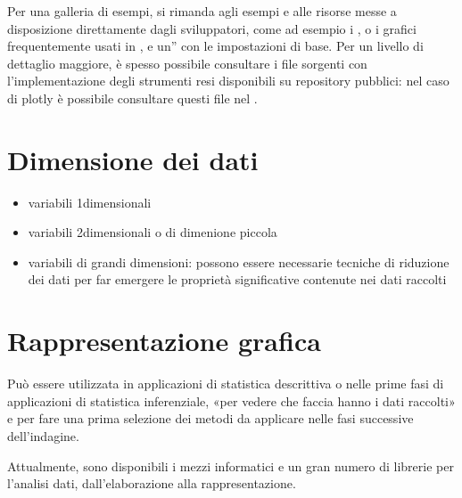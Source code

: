 \documentclass[letterpaper,10pt,italian]{jupyterBook}
\begin{document}
\sphinxAtStartPar
Per una galleria di esempi, si rimanda agli esempi e alle risorse messe a disposizione direttamente dagli sviluppatori, come ad esempio i , o i grafici frequentemente usati in , e un” con le impostazioni di base. Per un livello di dettaglio maggiore, è spesso possibile consultare i file sorgenti con l’implementazione degli strumenti resi disponibili su repository pubblici: nel caso di plotly è possibile consultare questi file nel .


\section{Dimensione dei dati}
\label{\detokenize{ch/statistics/descriptive:dimensione-dei-dati}}\begin{itemize}
\item {} 
\sphinxAtStartPar
variabili 1\sphinxhyphen{}dimensionali

\item {} 
\sphinxAtStartPar
variabili 2\sphinxhyphen{}dimensionali o di dimenione piccola

\item {} 
\sphinxAtStartPar
variabili di grandi dimensioni: possono essere necessarie tecniche di riduzione dei dati per far emergere le proprietà significative contenute nei dati raccolti

\end{itemize}


\section{Rappresentazione grafica}
\label{\detokenize{ch/statistics/descriptive:rappresentazione-grafica}}
\sphinxAtStartPar
{} Può essere utilizzata in applicazioni di statistica descrittiva o nelle prime fasi di applicazioni di statistica inferenziale, «per vedere che faccia hanno i dati raccolti» e per fare una prima selezione dei metodi da applicare nelle fasi successive dell’indagine.

\sphinxAtStartPar
Attualmente, sono disponibili i mezzi informatici e un gran numero di librerie per l’analisi dati, dall’elaborazione alla rappresentazione.
\end{document}

